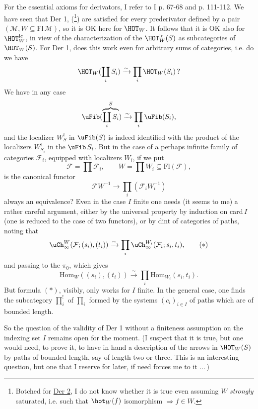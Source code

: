 For the essential axioms for derivators, I refer to I p. 67-68 and p. 111-112. We have seen that Der 1,  (\footnote[66]{Botched for \underline{Der 2}, I do not know whether it is true even assuming $W$ \textit{strongly} saturated, i.e. such that $\hot_W(f)$ isomorphism $\Longrightarrow f\in W$.}) are satisfied for every prederivator defined by a pair $(\mathcal{M},W\subseteq\mathrm{Fl}\,\mathcal{M})$, so it is OK here for $\HOT_W$. It follows that it is OK also for $\HOT_W^{\mathrm{lc}}$, in view of the characterization of the $\HOT_W^{\mathrm{lc}}(S)$ as subcategories of $\HOT_W(S)$. For Der 1, does this work even for arbitrary sums of categories, i.e. do we have %
\[ \HOT_W(\coprod_i S_i) \xrightarrow{\sim} \prod_i \HOT_W(S_i)\,? \]
We have in any case
\[ \uFib(\overbrace{\coprod\limits_i S_i}^{S}) \xrightarrow{\sim} \prod_i \uFib(S_i), \]
and the localizer $W_S^{\mathrm{f}}$ in $\uFib(S)$ is
indeed identified with the product of the localizers $W_{S_i}^{\mathrm{f}}$ in the $\uFib\,S_i$. But in the case of a perhaps infinite family of categories $\mathcal{F}_i$, equipped with localizers $W_i$, if we put
\[ \mathcal{F} = \prod\mathcal{F}_i, \qquad W = \prod W_i \subseteq \mathrm{Fl}(\mathcal{F}), \]
is the canonical functor
\[ \mathcal{F}W^{-1} \longrightarrow \prod_i(\mathcal{F}_iW_i^{-1}) \]
always an equivalence? Even in the case $I$ finite one needs (it seems to me) a rather careful argument, either by the universal property by induction on card\,$I$ (one is reduced to the case of two functors), or by dint of categories of paths, noting that
\[ \uCh_\infty^W(\mathcal{F};(s_i),(t_i)) \xrightarrow{\sim} \prod_i \uCh_\infty^{W_i}(\mathcal{F}_i;s_i,t_i), \tag*{$(*)$} \]
and passing to the $\pi_0$, which gives
\[ \mathrm{Hom}_W((s_i),(t_i)) \xrightarrow{\sim} \prod_i \mathrm{Hom}_{W_i}(s_i,t_i). \]
But formula $(*)$, visibly, only works for $I$ finite. In the general case, one finds the subcategory $\prod_i^!$ of $\prod_i$ formed by the systems $(c_i)_{i\in I}$ of paths which are of bounded length.

So the question of the validity of Der 1 without a finiteness assumption on the indexing set $I$
remains open for the moment. (I suspect that it is true, but one would need, to prove it, to have in hand a description of the arrows in $\HOT_W(S)$ by paths of bounded length, say of length two or three. This is an interesting question, but one that I reserve for later, if need forces me to it $\ldots\,$)

